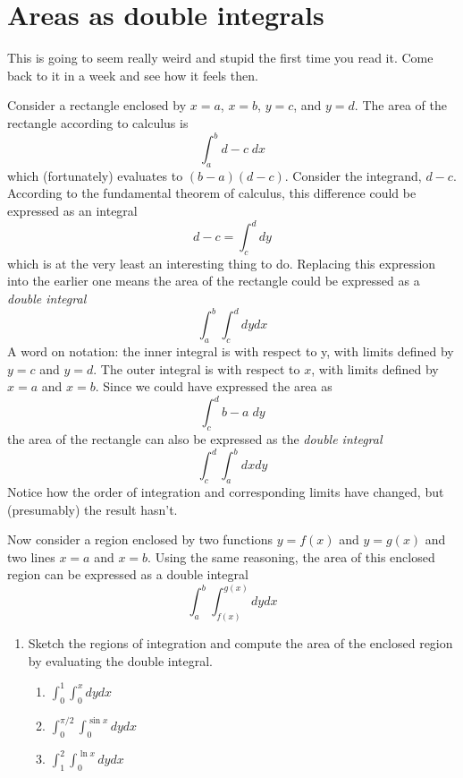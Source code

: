 \documentclass{tufte-handout}
\begin{document}
\section{Areas as double integrals}

This is going to seem really weird and stupid the first time you read it. Come back to it in a week and see how it feels then.

Consider a rectangle enclosed by $x=a$, $x=b$, $y=c$, and $y=d$. The area of the rectangle according to calculus is
\[\int_a^b d - c \; dx \]
which (fortunately) evaluates to $(b-a)(d-c)$. Consider the integrand, $d-c$. According to the fundamental theorem of calculus, this difference could be expressed as an integral
\[d - c = \int_c^d dy \]
which is at the very least an interesting thing to do. Replacing this expression into the earlier one means the area of the rectangle could be expressed as a {\it double integral}
\[\int_a^b \int_c^d dy dx \]
A word on notation: the inner integral is with respect to y, with limits defined by $y=c$ and $y=d$. The outer integral is with respect to $x$, with limits defined by $x=a$ and $x=b$. Since we could have expressed the area as
\[\int_c^d b - a \; dy \]
the area of the rectangle can also be expressed as the {\it double integral}
\[\int_c^d \int_a^b dx dy \]
Notice how the order of integration and corresponding limits have changed, but (presumably) the result hasn't.

Now consider a region enclosed by two functions $y = f(x)$ and $y=g(x)$ and two lines $x=a$ and $x=b$. Using the same reasoning, the area of this enclosed region can be expressed as a double integral
\[\int_a^b \int_{f(x)}^{g(x)} dy dx \]

\begin{enumerate}[resume]
\item Sketch the regions of integration and compute the area of the enclosed region by evaluating the double integral.
\begin{enumerate}
\item $ \int_0^1 \int_0^x dy dx $
\item $ \int_0^{\pi/2} \int_0^{\sin x} dy dx $
\item $ \int_1^2 \int_0^{\ln x} dy dx $
\end{enumerate}
\end{enumerate}
\end{document}
